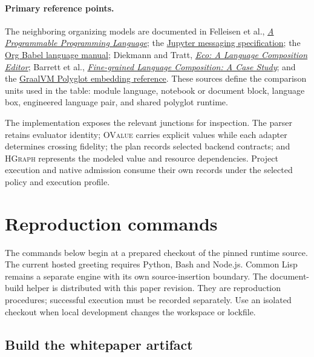 \documentclass[11pt,oneside]{article}
\newcommand{\ovalue}{{\mdseries\textsc{OValue}}}
\newcommand{\hgraph}{{\mdseries\textsc{HGraph}}}
\begin{document}
\paragraph{Primary reference points.}
The neighboring organizing models are documented in Felleisen et al.,
\href{https://cs.brown.edu/~sk/Publications/Papers/Published/fffkbmt-programmable-prog-lang/paper.pdf}{\emph{A
Programmable Programming Language}}; the
\href{https://jupyter-client.readthedocs.io/en/stable/}{Jupyter messaging
specification}; the
\href{https://orgmode.org/manual/Languages.html}{Org Babel language manual};
Diekmann and Tratt,
\href{https://soft-dev.org/pubs/html/diekmann_tratt__eco_a_language_composition_editor/}{\emph{Eco:
A Language Composition Editor}}; Barrett et al.,
\href{https://drops.dagstuhl.de/entities/document/10.4230/LIPIcs.ECOOP.2016.3}{\emph{Fine-grained
Language Composition: A Case Study}}; and the
\href{https://www.graalvm.org/dev/reference-manual/embed-languages/}{GraalVM
Polyglot embedding reference}. These sources define the comparison units used
in the table: module language, notebook or document block, language box,
engineered language pair, and shared polyglot runtime.

The implementation exposes the relevant junctions for inspection. The parser
retains evaluator identity; \ovalue{} carries explicit values while each
adapter determines crossing fidelity; the plan records selected backend
contracts; and \hgraph{} represents the modeled value and resource
dependencies. Project execution and native admission consume their own
records under the selected policy and execution profile.

\section{Reproduction commands}

The commands below begin at a prepared checkout of the pinned runtime source.
The current hosted greeting requires Python, Bash and Node.js. Common Lisp
remains a separate engine with its own source-insertion boundary. The
document-build helper is distributed with this paper revision.
They are reproduction procedures; successful execution must be recorded
separately. Use an isolated checkout when local development changes the
workspace or lockfile.

\subsection{Build the whitepaper artifact}
\end{document}
